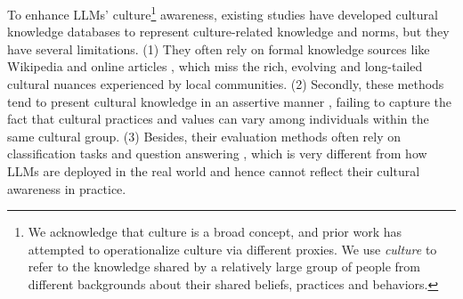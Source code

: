\documentclass{article} %
\newcommand{\caleb}[1]{\textcolor{aqua}{[#1 --Caleb]}}
\newcommand{\wyshi}[1]{\textcolor{red}{[#1 --Weiyan]}}
\begin{document}
To enhance LLMs' culture\footnote{We acknowledge that culture is a broad concept, and prior work has attempted to operationalize culture via different proxies. We use \emph{culture} to refer to the knowledge shared by a relatively large group of people from different backgrounds about their shared beliefs, practices and behaviors.} awareness,  existing studies have developed cultural knowledge databases to represent culture-related knowledge and norms, but they have several limitations. (1) They often rely on formal knowledge sources like Wikipedia and online articles \citep{candle2023,fung2024massively}, which miss the rich, evolving and long-tailed cultural nuances experienced by local communities. (2) Secondly, these methods tend to present cultural knowledge in an assertive manner \citep{candle2023,fung2024massively, yin2022geomlama}, failing to capture the fact that cultural practices and values %
can vary among individuals within the same cultural group. 
(3) Besides, their evaluation methods often rely on classification tasks and question answering \citep{naous2023having,afina2024can, shafayat2024multi}, which is very different from how LLMs are deployed in the real world and hence cannot reflect their cultural awareness in practice.  %
\end{document}
